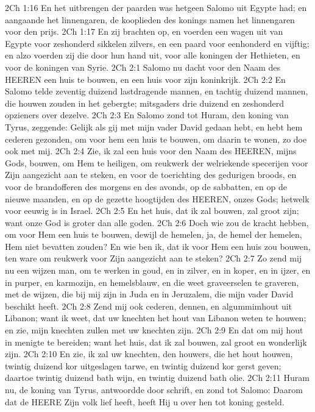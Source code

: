 2Ch 1:16  En het uitbrengen der paarden was hetgeen Salomo uit Egypte had; en aangaande het linnengaren, de kooplieden des konings namen het linnengaren voor den prijs.
2Ch 1:17  En zij brachten op, en voerden een wagen uit van Egypte voor zeshonderd sikkelen zilvers, en een paard voor eenhonderd en vijftig; en alzo voerden zij die door hun hand uit, voor alle koningen der Hethieten, en voor de koningen van Syrie.
2Ch 2:1  Salomo nu dacht voor den Naam des HEEREN een huis te bouwen, en een huis voor zijn koninkrijk.
2Ch 2:2  En Salomo telde zeventig duizend lastdragende mannen, en tachtig duizend mannen, die houwen zouden in het gebergte; mitsgaders drie duizend en zeshonderd opzieners over dezelve.
2Ch 2:3  En Salomo zond tot Huram, den koning van Tyrus, zeggende: Gelijk als gij met mijn vader David gedaan hebt, en hebt hem cederen gezonden, om voor hem een huis te bouwen, om daarin te wonen, zo doe ook met mij.
2Ch 2:4  Zie, ik zal een huis voor den Naam des HEEREN, mijns Gods, bouwen, om Hem te heiligen, om reukwerk der welriekende specerijen voor Zijn aangezicht aan te steken, en voor de toerichting des gedurigen broods, en voor de brandofferen des morgens en des avonds, op de sabbatten, en op de nieuwe maanden, en op de gezette hoogtijden des HEEREN, onzes Gods; hetwelk voor eeuwig is in Israel.
2Ch 2:5  En het huis, dat ik zal bouwen, zal groot zijn; want onze God is groter dan alle goden.
2Ch 2:6  Doch wie zou de kracht hebben, om voor Hem een huis te bouwen, dewijl de hemelen, ja, de hemel der hemelen, Hem niet bevatten zouden? En wie ben ik, dat ik voor Hem een huis zou bouwen, ten ware om reukwerk voor Zijn aangezicht aan te steken?
2Ch 2:7  Zo zend mij nu een wijzen man, om te werken in goud, en in zilver, en in koper, en in ijzer, en in purper, en karmozijn, en hemelsblauw, en die weet graveerselen te graveren, met de wijzen, die bij mij zijn in Juda en in Jeruzalem, die mijn vader David beschikt heeft.
2Ch 2:8  Zend mij ook cederen, dennen, en algummimhout uit Libanon; want ik weet, dat uw knechten het hout van Libanon weten te houwen; en zie, mijn knechten zullen met uw knechten zijn.
2Ch 2:9  En dat om mij hout in menigte te bereiden; want het huis, dat ik zal bouwen, zal groot en wonderlijk zijn.
2Ch 2:10  En zie, ik zal uw knechten, den houwers, die het hout houwen, twintig duizend kor uitgeslagen tarwe, en twintig duizend kor gerst geven; daartoe twintig duizend bath wijn, en twintig duizend bath olie.
2Ch 2:11  Huram nu, de koning van Tyrus, antwoordde door schrift, en zond tot Salomo: Daarom dat de HEERE Zijn volk lief heeft, heeft Hij u over hen tot koning gesteld.
